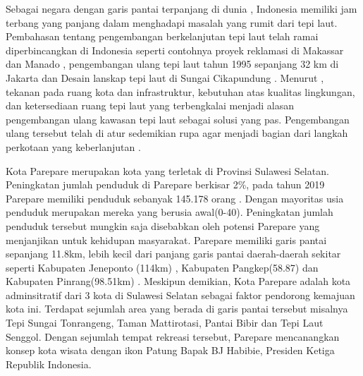 \documentclass[12pt,oneside]{udthesis}
\begin{document}
Sebagai negara dengan garis pantai terpanjang di dunia \citep{hindersah2015}, Indonesia memiliki jam terbang yang panjang dalam menghadapi masalah yang rumit dari tepi laut. Pembahasan tentang pengembangan berkelanjutan tepi laut telah ramai diperbincangkan di Indonesia seperti contohnya proyek reklamasi di Makassar dan Manado \citep{andi2017,tungka2012, fhuh2017}, pengembangan ulang tepi laut tahun 1995 sepanjang 32 km di Jakarta \citep{pramesti2017} dan Desain lanskap tepi laut di Sungai Cikapundung \citep{ainy2016}. Menurut \cite{breen1994}, tekanan pada ruang kota dan infrastruktur, kebutuhan atas kualitas lingkungan, dan ketersediaan ruang tepi laut yang terbengkalai menjadi alasan pengembangan ulang kawasan tepi laut sebagai solusi yang pas. Pengembangan ulang tersebut telah di atur sedemikian rupa agar menjadi bagian dari langkah perkotaan yang keberlanjutan \citep{pramesti2017}.

Kota Parepare merupakan kota yang terletak di Provinsi Sulawesi Selatan. Peningkatan jumlah penduduk di Parepare berkisar 2\%, pada tahun 2019 Parepare memiliki penduduk sebanyak 145.178 orang \citep{bpskotaparepare2020}. Dengan mayoritas usia penduduk  merupakan mereka yang berusia awal(0-40). Peningkatan jumlah penduduk tersebut mungkin saja disebabkan oleh potensi Parepare yang menjanjikan untuk kehidupan masyarakat.
Parepare memiliki garis pantai sepanjang 11.8km, lebih kecil dari panjang garis pantai daerah-daerah sekitar seperti Kabupaten Jeneponto (114km) \citep{wardasusaniati2011}, Kabupaten Pangkep(58.87) dan Kabupaten Pinrang(98.51km) \citep{goni2018}. Meskipun demikian, Kota Parepare adalah kota adminsitratif dari 3 kota di Sulawesi Selatan \citep{junaid2016} sebagai faktor pendorong kemajuan kota ini.
Terdapat sejumlah area yang berada di garis pantai tersebut misalnya Tepi Sungai Tonrangeng, Taman Mattirotasi, Pantai Bibir dan Tepi Laut Senggol.
Dengan sejumlah tempat rekreasi tersebut, Parepare mencanangkan konsep kota wisata dengan ikon Patung Bapak BJ Habibie, Presiden Ketiga Republik Indonesia.
\end{document}
